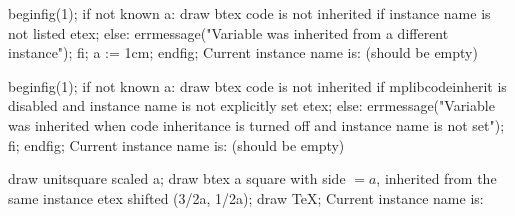 \mplibcode
beginfig(1);
if not known a:
  draw btex code is not inherited if instance name is not listed etex;
else:
  errmessage("Variable was inherited from a different instance");
fi;
a := 1cm;
endfig;
\endmplibcode
Current instance name is: \currentmpinstancename (should be empty) \baselineskip

\mplibcode
beginfig(1);
if not known a:
  draw btex code is not inherited if mplibcodeinherit is disabled and instance name is not explicitly set etex;
else:
  errmessage("Variable was inherited when code inheritance is turned off and instance name is not set");
fi;
endfig;
\endmplibcode
Current instance name is: \currentmpinstancename (should be empty) \baselineskip

\mplibcode[instanceOne]
draw unitsquare scaled a;
draw btex a square with side $=a$, inherited from the same instance etex shifted (3/2a, 1/2a);
  draw TeX;
\endmplibcode
Current instance name is: \currentmpinstancename {}\baselineskip

\bye
